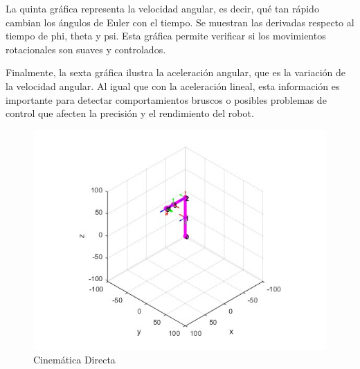La quinta gráfica representa la velocidad angular, es decir, qué tan rápido cambian los ángulos de Euler con el tiempo. Se muestran las derivadas respecto al tiempo de phi, theta y psi. Esta gráfica permite verificar si los movimientos rotacionales son suaves y controlados.

Finalmente, la sexta gráfica ilustra la aceleración angular, que es la variación de la velocidad angular. Al igual que con la aceleración lineal, esta información es importante para detectar comportamientos bruscos o posibles problemas de control que afecten la precisión y el rendimiento del robot.

\begin{figure}
	\centering
	\includegraphics[width=0.7\linewidth]{img/cinematicadirecta}
	\caption{Cinemática Directa}
	\label{fig:cinematicadirecta}
\end{figure}




